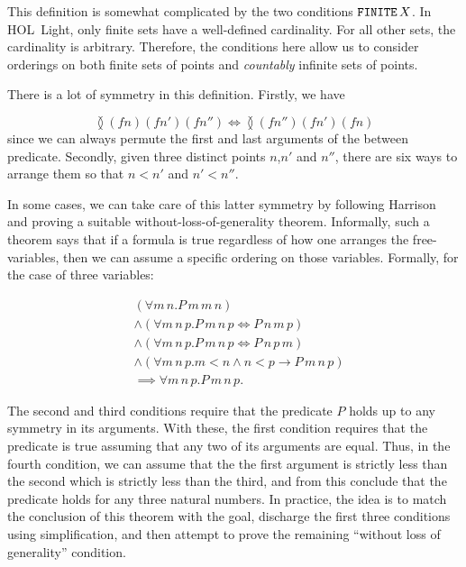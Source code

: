 This definition is somewhat complicated by the two conditions $\texttt{FINITE}\,X$. In HOL~Light, only finite sets have a well-defined cardinality. For all other sets, the cardinality is arbitrary. Therefore, the conditions here allow us to consider orderings on both finite sets of points and \emph{countably} infinite sets of points.

There is a lot of symmetry in this definition. Firstly, we have

\begin{displaymath}
\between{(f n)}{(f n')}{(f n'')} \iff \between{(f n'')}{(f n')}{(f n)}
\end{displaymath}
since we can always permute the first and last arguments of the between predicate. Secondly, given three distinct points $n$,$n'$ and $n''$, there are six ways to arrange them so that $n < n'$ and $n' < n''$.

In some cases, we can take care of this latter symmetry by following Harrison~\cite{HarrisonWLOG} and proving a suitable without-loss-of-generality theorem. Informally, such a theorem says that if a formula is true regardless of how one arranges the free-variables, then we can assume a specific ordering on those variables. Formally, for the case of three variables:

\begin{align*}
&(\forall m\,n. P\,m\,m\,n)\\
&\wedge \left(\forall m\,n\,p. P\,m\,n\,p \iff P\,n\,m\,p\right)\\
&\wedge \left(\forall m\,n\,p. P\,m\,n\,p \iff P\,n\,p\,m\right)\\
&\wedge (\forall m\,n\,p. m < n \wedge n < p \rightarrow P\,m\,n\,p)\\
&\implies \forall m\,n\,p. P\,m\,n\,p.
\end{align*}

The second and third conditions require that the predicate $P$ holds up to any symmetry in its arguments. With these, the first condition requires that the predicate is true assuming that any two of its arguments are equal. Thus, in the fourth condition, we can assume that the the first argument is strictly less than the second which is strictly less than the third, and from this conclude that the predicate holds for any three natural numbers. In practice, the idea is to match the conclusion of this theorem with the goal, discharge the first three conditions using simplification, and then attempt to prove the remaining ``without loss of generality'' condition.

